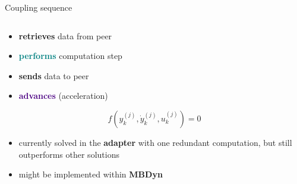 \documentclass[10pt,t]{beamer}
\begin{document}
\begin{frame}{Coupling sequence}
\begin{columns}
\begin{column}{0.5\textwidth}
\vspace{0.2cm}

\begin{itemize}
    \item \textcolor{dblue}{\textbf{retrieves}} data from peer
    \item \textcolor{teal}{\textbf{performs}} computation step
    \item \textcolor{fgreen}{\textbf{sends}} data to peer
    \item \textcolor{indigo}{\textbf{advances}} (acceleration)
\end{itemize}

\pause

\vspace{0.4cm}
$$f\left(y_k^{(j)},\dot{y}_k^{(j)},u_k^{(j)}\right)=0$$


\begin{itemize}
    \item currently solved in the \textbf{adapter} with one redundant computation, but still outperforms other solutions
    \item might be implemented within \textcolor{dorange}{\textbf{MBDyn}}
\end{itemize}


\end{column}


\end{columns}

    
\end{frame}
\end{document}
